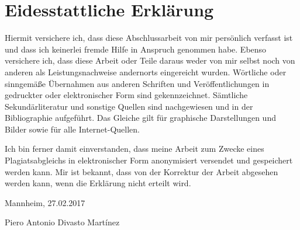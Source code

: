\chapter*{Eidesstattliche Erkl\"{a}rung}
\thispagestyle{empty}
Hiermit versichere ich, dass diese Abschlussarbeit von mir persönlich verfasst
ist und dass ich keinerlei fremde Hilfe in Anspruch genommen habe. Ebenso
versichere ich, dass diese Arbeit oder Teile daraus weder von mir selbst noch
von anderen als Leistungsnachweise andernorts eingereicht wurden. Wörtliche oder
sinn\-gemäße Übernahmen aus anderen Schriften und Veröffentlichungen in gedruckter
oder elektronischer Form sind gekennzeichnet. Sämtliche Sekundärliteratur und
sonstige Quellen sind nachgewiesen und in der Bibliographie aufgeführt. Das
Glei\-che gilt für graphische Darstellungen und Bilder sowie für alle
Internet-Quellen.

Ich bin ferner damit einverstanden, dass meine Arbeit zum Zwecke eines
Plagiatsabgleichs in elektronischer Form anonymisiert versendet und gespeichert
werden kann. Mir ist bekannt, dass von der Korrektur der Arbeit abgesehen werden
kann, wenn die Erklärung nicht erteilt wird.
\bigskip

\raggedright{Mannheim, 27.02.2017} \bigskip \bigskip \bigskip

Piero Antonio Divasto Martínez